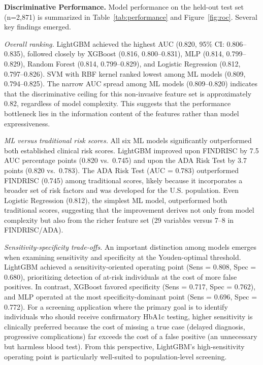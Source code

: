 \documentclass{amia}
\begin{document}
\textbf{Discriminative Performance.}
Model performance on the held-out test set (n=2,871) is summarized in Table~\ref{tab:performance} and Figure~\ref{fig:roc}. Several key findings emerged.

\textit{Overall ranking.} LightGBM achieved the highest AUC (0.820, 95\% CI: 0.806--0.835), followed closely by XGBoost (0.816, 0.800--0.831), MLP (0.814, 0.799--0.829), Random Forest (0.814, 0.799--0.829), and Logistic Regression (0.812, 0.797--0.826). SVM with RBF kernel ranked lowest among ML models (0.809, 0.794--0.825). The narrow AUC spread among ML models (0.809--0.820) indicates that the discriminative ceiling for this non-invasive feature set is approximately 0.82, regardless of model complexity. This suggests that the performance bottleneck lies in the information content of the features rather than model expressiveness.

\textit{ML versus traditional risk scores.} All six ML models significantly outperformed both established clinical risk scores. LightGBM improved upon FINDRISC by 7.5 AUC percentage points (0.820 vs.\ 0.745) and upon the ADA Risk Test by 3.7 points (0.820 vs.\ 0.783). The ADA Risk Test (AUC = 0.783) outperformed FINDRISC (0.745) among traditional scores, likely because it incorporates a broader set of risk factors and was developed for the U.S. population. Even Logistic Regression (0.812), the simplest ML model, outperformed both traditional scores, suggesting that the improvement derives not only from model complexity but also from the richer feature set (29 variables versus 7--8 in FINDRISC/ADA).

\textit{Sensitivity-specificity trade-offs.} An important distinction among models emerges when examining sensitivity and specificity at the Youden-optimal threshold. LightGBM achieved a sensitivity-oriented operating point (Sens = 0.808, Spec = 0.680), prioritizing detection of at-risk individuals at the cost of more false positives. In contrast, XGBoost favored specificity (Sens = 0.717, Spec = 0.762), and MLP operated at the most specificity-dominant point (Sens = 0.696, Spec = 0.772). For a screening application where the primary goal is to identify individuals who should receive confirmatory HbA1c testing, higher sensitivity is clinically preferred because the cost of missing a true case (delayed diagnosis, progressive complications) far exceeds the cost of a false positive (an unnecessary but harmless blood test). From this perspective, LightGBM's high-sensitivity operating point is particularly well-suited to population-level screening.
\end{document}
